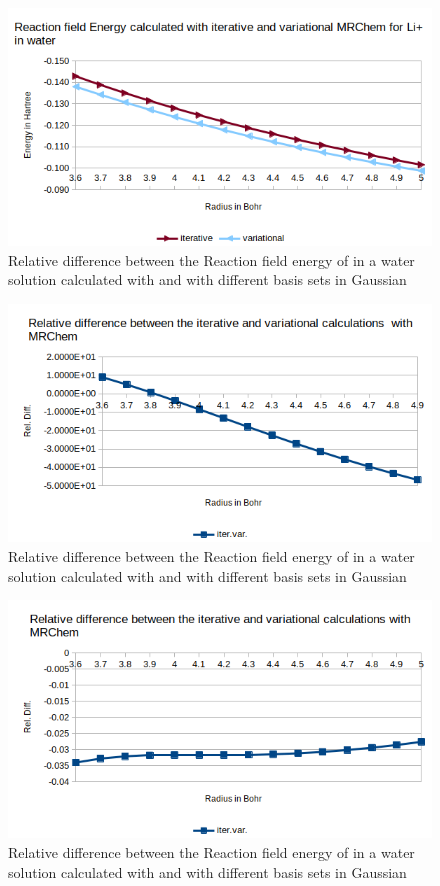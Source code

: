 \documentclass[../master_thesis.tex]{subfiles}
\begin{document}
\begin{figure}[!htb]
  \centering
  \includegraphics[width=0.75\linewidth]{img/lipvarEr.png}
  \caption{Relative difference between the Reaction field energy of  in a water solution calculated with \mrchem
  and with different basis sets in Gaussian}
  \label{fig:lipvarEr}
\end{figure}

\begin{figure}[!htb]
  \centering
    \includegraphics[width=\linewidth]{img/watitervarreldiff.png}
  \caption{Relative difference between the Reaction field energy of  in a water solution calculated with \mrchem
  and with different basis sets in Gaussian}
  \label{fig:watreldiffvardaug}
\end{figure}

\begin{figure}[!htb]
  \centering
    \includegraphics[width=\linewidth]{img/lipitervarreldiff.png}
  \caption{Relative difference between the Reaction field energy of  in a water solution calculated with \mrchem
  and with different basis sets in Gaussian}
  \label{fig:lipreldiffvardaug}
\end{figure}
\clearpage
\end{document}
